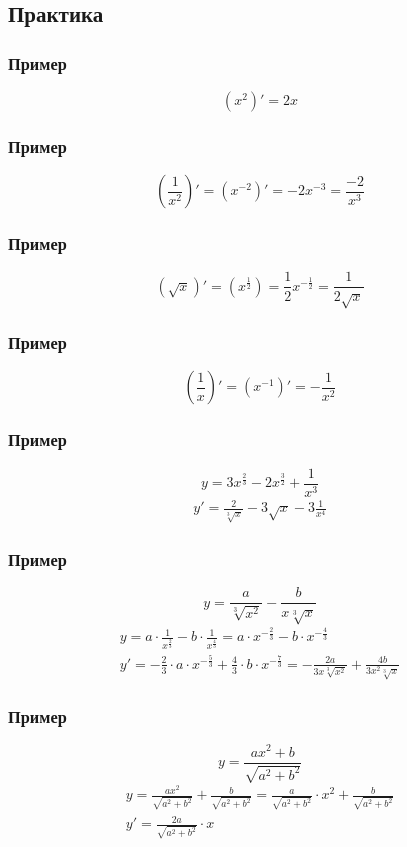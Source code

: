 \documentclass{article}
\begin{document}
\subsection{Практика}

\subsubsection{Пример}
\[
    (x^2)' = 2x
\]

\subsubsection{Пример}
\[
    \left( \frac{1}{x^2} \right)' = (x^{-2})' = -2x^{-3} = \frac{-2}{x^3}
\]

\subsubsection{Пример}
\[
    (\sqrt{x})' = (x^{\frac{1}{2}}) = \frac{1}{2} x^{-\frac{1}{2}} = \frac{1}{2 \sqrt{x}}
\]

\subsubsection{Пример}
\[
    \left( \frac{1}{x} \right)' = (x^{-1})' = -\frac{1}{x^2}
\]

\subsubsection{Пример}
\[
    y = 3x^{\frac{2}{3}} - 2x^{\frac{3}{2}} + \frac{1}{x^3}
\]
\begin{gather*}
    y' = \frac{2}{\sqrt[3]{x}} - 3 \sqrt{x} - 3 \frac{1}{x^4}
\end{gather*}

\subsubsection{Пример}
\[
    y = \frac{a}{\sqrt[3]{x^2}} - \frac{b}{x \sqrt[3]{x}}
\]
\begin{gather*}
    y = a \cdot \frac{1}{x^{\frac{2}{3}}} - b \cdot \frac{1}{x^{\frac{4}{3}}} =
    a \cdot x^{-\frac{2}{3}} - b \cdot x^{-\frac{4}{3}} \\
    y' = -\frac{2}{3} \cdot a \cdot x^{-\frac{5}{3}} + \frac{4}{3} \cdot b \cdot x^{-\frac{7}{3}} =
    -\frac{2a}{3x \sqrt[3]{x^2}} + \frac{4b}{3x^2 \sqrt[3]{x}}
\end{gather*}

\subsubsection{Пример}
\[
    y = \frac{ax^2 + b}{\sqrt{a^2 + b^2}}
\]
\begin{gather*}
    y = \frac{ax^2}{\sqrt{a^2 + b^2}} + \frac{b}{\sqrt{a^2 + b^2}} = 
    \frac{a}{\sqrt{a^2 + b^2}} \cdot x^2 + \frac{b}{\sqrt{a^2 + b^2}} \\
    y' = \frac{2a}{\sqrt{a^2 + b^2}} \cdot x
\end{gather*}
\end{document}
